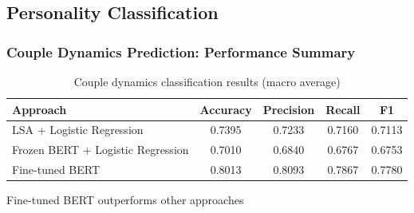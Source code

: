 \documentclass{beamer}
\begin{document}
\subsection{Personality Classification}

\begin{frame}
\frametitle{Couple Dynamics Prediction: Performance Summary}

\begin{table}
\centering
\footnotesize
\begin{tabular}{lcccc}
\toprule
Approach & Accuracy & Precision & Recall & F1 \\
\midrule
LSA + Logistic Regression & 0.7395 & 0.7233 & 0.7160 & 0.7113 \\
Frozen BERT + Logistic Regression & 0.7010 & 0.6840 & 0.6767 & 0.6753 \\
Fine-tuned BERT & 0.8013 & 0.8093 & 0.7867 & 0.7780 \\
\bottomrule
\end{tabular}
\caption{Couple dynamics classification results (macro average)}
\end{table}

\vspace{0.2cm}
\begin{center}
\colorbox{blue!10}{\parbox{0.75\linewidth}{\centering Fine-tuned BERT outperforms other approaches}}
\end{center}

\end{frame}
\end{document}
